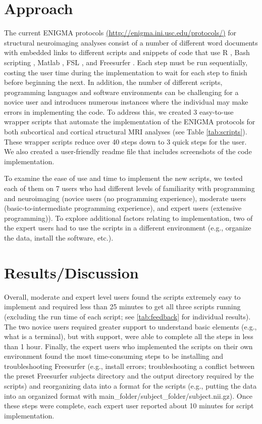 \documentclass[twocolumn]{bmcart}%
\begin{document}
\section{Approach}\label{approach}

The current ENIGMA protocols \url{(http://enigma.ini.usc.edu/protocols/)} for structural neuroimaging analyses consist of a number of different word documents with embedded links to different scripts and snippets of code that use R \cite{rmanual}, Bash scripting \cite{bashmanual}, Matlab \cite{MATLAB:2010}, FSL \cite{jenkinson2012}, and Freesurfer \cite{fischl2012}. Each step must be run sequentially, costing the user time during the implementation to wait for each step to finish before beginning the next. In addition, the number of different scripts, programming languages and software environments can be challenging for a novice user and introduces numerous instances where the individual may make errors in implementing the code. To address this, we created 3 easy-to-use wrapper scripts that automate the implementation of the ENIGMA protocols for both subcortical and cortical structural MRI analyses (see Table \ref{tab:scripts}). These wrapper scripts reduce over 40 steps down to 3 quick steps for the user. We also created a user-friendly readme file that includes screenshots of the code implementation.

To examine the ease of use and time to implement the new scripts, we tested each of them on 7 users who had different levels of familiarity with programming and neuroimaging (novice users (no programming experience), moderate users (basic-to-intermediate programming experience), and expert users (extensive programming)). To explore additional factors relating to implementation, two of the expert users had to use the scripts in a different environment (e.g., organize the data, install the software, etc.).

\section{Results/Discussion}\label{resultsdiscussion}

Overall, moderate and expert level users found the scripts extremely easy to implement and required less than 25 minutes to get all three scripts running (excluding the run time of each script; see \ref{tab:feedback} for individual results). The two novice users required greater support to understand basic elements (e.g., what is a terminal), but with support, were able to complete all the steps in less than 1 hour. Finally, the expert users who implemented the scripts on their own environment found the most time-consuming steps to be installing and troubleshooting Freesurfer (e.g., install errors; troubleshooting a conflict between the preset Freesurfer subjects directory and the output directory required by the scripts) and reorganizing data into a format for the scripts (e.g., putting the data into an organized format with main\_folder/subject\_folder/subject.nii.gz). Once these steps were complete, each expert user reported about 10 minutes for script implementation.
\end{document}
